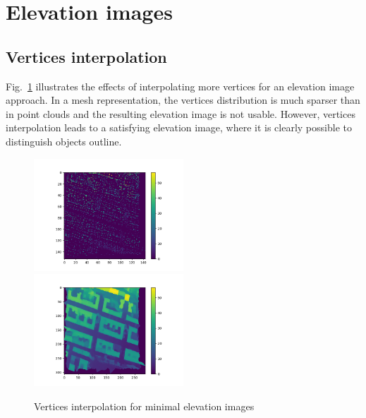 \documentclass{kththesis}
\begin{document}
\newpage
\section{Elevation images}
\subsection{Vertices interpolation}
Fig.~\ref{fig:vertices_generation} illustrates the effects of interpolating more vertices for an elevation image approach. In a mesh representation, the vertices distribution is much sparser than in point clouds and the resulting elevation image is not usable. However, vertices interpolation leads to a satisfying elevation image, where it is clearly possible to distinguish objects outline. 
\begin{figure}[H]
        \includegraphics[width=0.5\textwidth]{images/Results/minimal_vertices.png} ~ \includegraphics[width=0.5\textwidth]{images/Results/minimal_z_1msquare.png}
    
    \caption{Vertices interpolation for minimal elevation images}
    \label{fig:vertices_generation}
\end{figure}
\end{document}
